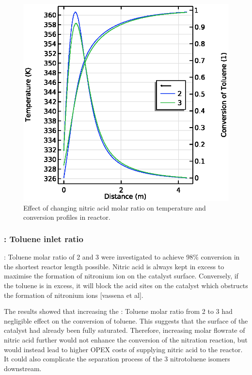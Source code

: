 \begin{figure}[h]
\begin{minipage}{0.49\linewidth}
        \includegraphics[width=\linewidth]{figures/S3-T-X.eps}
        \caption{Effect of changing nitric acid molar ratio on temperature and conversion profiles in reactor.}
        \label{fig:comsol-S3-T-X}
    \end{minipage}
\end{figure}

\subsubsection{ : Toluene inlet ratio}

 : Toluene molar ratio of 2 and 3 were investigated to achieve 98\% conversion in the shortest reactor length possible. Nitric acid is always kept in excess to maximise the formation of nitronium ion on the catalyst surface. Conversely, if the toluene is in excess, it will block the acid sites on the catalyst which obstructs the formation of nitronium ions [vassena et al]. 

The results showed that increasing the  : Toluene molar ratio from 2 to 3 had negligible effect on the conversion of toluene. This suggests that the surface of the catalyst had already been fully saturated. Therefore, increasing molar flowrate of nitric acid further would not enhance the conversion of the nitration reaction, but would instead lead to higher OPEX costs of supplying nitric acid to the reactor. It could also complicate the separation process of the 3 nitrotoluene isomers downstream. 

